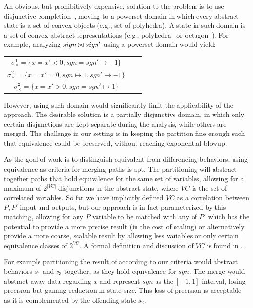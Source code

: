 An obvious, but prohibitively expensive, solution to the problem is to use disjunctive completion~\cite{TODO}, moving to a powerset domain in which every abstract state is a set of convex objects (e.g., set of polyhedra).
A state in such domain is a set of convex abstract representations (e.g., polyhedra~\cite{CousotHalbwachs78} or octagon~\cite{Mine2006}). For example, analyzing $sign \bowtie sign'$ using a powerset domain would yield:

\vspace{0.1in}
\begin{tabular}{ccc}
\hspace{1cm} $\sigma_{\times}^1 = \{x = x' < 0, sgn = sgn' \mapsto -1\}$
\\
\hspace{1cm} $\sigma_{\times}^2 = \{x = x' = 0, sgn \mapsto 1, sgn' \mapsto -1\}$
\\
\hspace{1cm} $\sigma_{\times}^3 = \{x = x' > 0, sgn = sgn' \mapsto 1\}$
\\
\end{tabular}
\vspace{0.1in}

However, using such domain would significantly limit the applicability of the approach. The desirable solution is a partially disjunctive domain, in which only certain disjunctions are kept separate during the analysis, while others are merged. The challenge in our setting is in keeping the partition fine enough such that equivalence could be preserved, without reaching exponential blowup.

As the goal of work is to distinguish equivalent from differencing behaviors, using equivalence as criteria for merging paths is apt. The partitioning will abstract together paths that hold equivalence for the same set of variables, allowing for a maximum of $2^{|VC|}$ disjunctions in the abstract state, where $VC$ is the set of correlated variables. So far we have implicitly defined $VC$ as a correlation between $P,P'$ input and outputs, but our approach is in fact parameterized by this matching, allowing for any $P$ variable to be matched with any of $P'$ which has the potential to provide a more precise result (in the cost of scaling) or alternatively provide a more coarse, scalable result by allowing less variables or only certain equivalence classes of $2^{VC}$. A formal definition and discussion of $VC$ is found in .

For example partitioning the result of  according to our criteria would abstract behaviors $s_1$ and $s_3$ together, as they hold equivalence for $sgn$. The merge would abstract away data regarding $x$ and represent $sgn$ as the $[-1,1]$ interval, losing precision but gaining reduction in state size. This loss of precision is acceptable as it is complemented by the offending state $s_2$.

